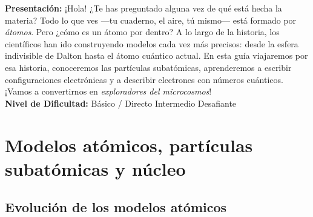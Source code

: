 \documentclass[12pt, letterpaper]{article}
\begin{document}


\vspace{4pt}
\begin{cuadroinfo}
  \small
  \textbf{Presentación:} ¡Hola! ¿Te has preguntado alguna vez de qué está hecha la materia? Todo lo que ves —tu cuaderno, el aire, tú mismo— está formado por \emph{átomos}. Pero ¿cómo es un átomo por dentro? A lo largo de la historia, los científicos han ido construyendo modelos cada vez más precisos: desde la esfera indivisible de Dalton hasta el átomo cuántico actual. En esta guía viajaremos por esa historia, conoceremos las partículas subatómicas, aprenderemos a escribir configuraciones electrónicas y a describir electrones con números cuánticos. ¡Vamos a convertirnos en \emph{exploradores del microcosmos}!
  \\[4pt]
  \textbf{Nivel de Dificultad:}\quad
  \facil{} Básico / Directo \quad
  \medio{} Intermedio \quad
  \dificil{} Desafiante
\end{cuadroinfo}

\vspace{8pt}

\section{Modelos atómicos, partículas subatómicas y núcleo}

\subsection{Evolución de los modelos atómicos}
\end{document}
